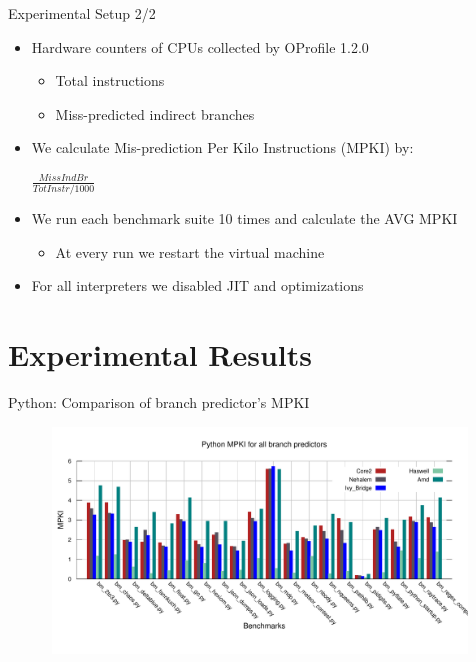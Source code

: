 \documentclass[10pt]{beamer}
\begin{document}
\begin{frame}{Experimental Setup 2/2}
	\begin{itemize}
		\item {Hardware counters of CPUs collected by OProfile 1.2.0}
			\begin{itemize}
				\item {Total instructions}
				\item {Miss-predicted indirect branches}
			\end{itemize}
		\item {We calculate Mis-prediction Per Kilo Instructions (MPKI) by: } 
            \begin{center}
                $\frac{MissIndBr}{TotInstr/1000} $%
            \end{center}
		\item {We run each benchmark suite 10 times and calculate the AVG MPKI}
		\begin{itemize}
			\item {At every run we restart the virtual machine}
		\end{itemize}
		\item {For all interpreters we disabled JIT and optimizations}
		
	\end{itemize}
\end{frame}

\section{Experimental Results}
\begin{frame}{Python: Comparison of branch predictor's MPKI}
    \begin{figure}[t]
        \centering
        \includegraphics[width=11.5cm, height=6cm]{figures/python_MPKI.pdf}
    \end{figure}
\end{frame}
\end{document}

